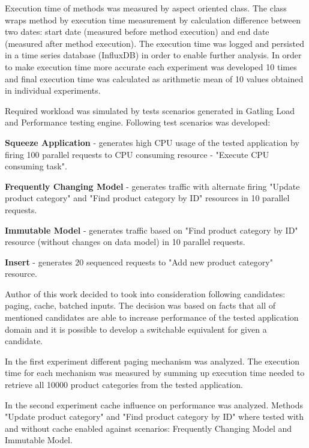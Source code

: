 \documentclass[12pt,a4paper]{article}
\let\tempone\itemize
\let\temptwo\enditemize
\renewenvironment{itemize}{\tempone\addtolength{\itemsep}{-0.4\baselineskip}}{\temptwo}
\begin{document}
Execution time of methods was measured by aspect oriented class. The class wraps method by execution time measurement by calculation difference between two dates: start date (measured before method execution) and end date (measured after method execution). The execution time was logged and persisted in a time series database (InfluxDB) in order to enable further analysis. In order to make execution time more accurate each experiment was developed 10 times and final execution time was calculated as arithmetic mean of 10 values obtained in individual experiments. 

Required workload was simulated by tests scenarios generated in Gatling Load and Performance testing engine\cite{gatling}. Following test scenarios was developed:
\begin{itemize}
\item \textbf{Squeeze Application} - generates high CPU usage of the tested application by firing 100 parallel requests to CPU consuming resource - "Execute CPU consuming task". 
\item \textbf{Frequently Changing Model} - generates traffic with alternate firing  "Update product category" and "Find product category by ID" resources in 10 parallel requests.
\item \textbf{Immutable Model} - generates traffic based on "Find product category by ID" resource (without changes on data model) in 10 parallel requests.
\item \textbf{Insert} - generates 20 sequenced requests to "Add new product category" resource. 
\end{itemize}

Author of this work decided to took into consideration following candidates: paging, cache, batched inputs. The decision was based on facts that all of mentioned candidates are able to increase performance of the  tested application domain and it is possible to develop a switchable equivalent for given a candidate. 

In the first experiment different paging mechanism was analyzed. The execution time for each mechanism was measured by summing up execution time needed to retrieve all 10000 product categories from the tested application.   

In the second experiment cache influence on performance was analyzed. Methods "Update product category" and "Find product category by ID" where tested with and without cache enabled against scenarios: Frequently Changing Model and    Immutable Model. 
\end{document}
